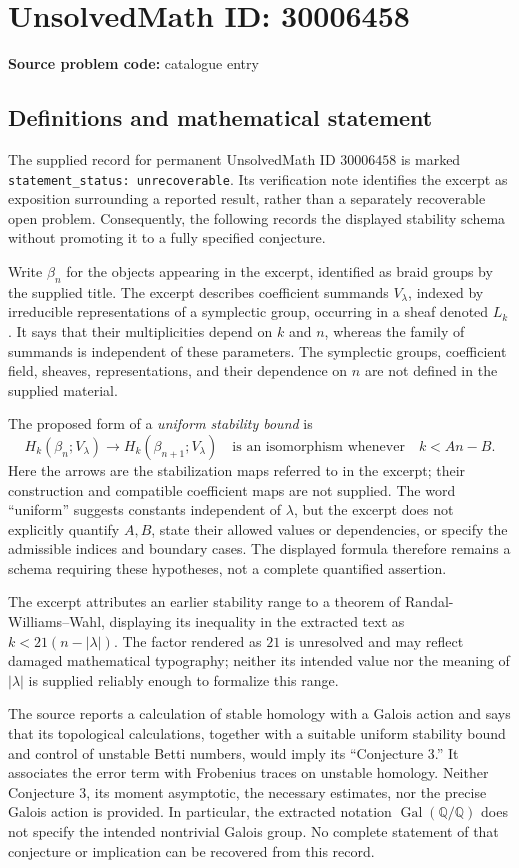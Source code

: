 \documentclass[11pt]{article}
\begin{document}
\section*{UnsolvedMath ID: 30006458}
\textbf{Source problem code:} catalogue entry
\subsection{Definitions and mathematical statement}
The supplied record for permanent UnsolvedMath ID \(30006458\) is marked \texttt{statement\_status: unrecoverable}. Its verification note identifies the excerpt as exposition surrounding a reported result, rather than a separately recoverable open problem. Consequently, the following records the displayed stability schema without promoting it to a fully specified conjecture.

Write \(\beta_n\) for the objects appearing in the excerpt, identified as braid groups by the supplied title. The excerpt describes coefficient summands \(V_\lambda\), indexed by irreducible representations of a symplectic group, occurring in a sheaf denoted \(L_k\). It says that their multiplicities depend on \(k\) and \(n\), whereas the family of summands is independent of these parameters. The symplectic groups, coefficient field, sheaves, representations, and their dependence on \(n\) are not defined in the supplied material.

The proposed form of a \emph{uniform stability bound} is
\[
H_k(\beta_n;V_\lambda)\longrightarrow H_k(\beta_{n+1};V_\lambda)
\quad\text{is an isomorphism whenever}\quad k<An-B.
\]
Here the arrows are the stabilization maps referred to in the excerpt; their construction and compatible coefficient maps are not supplied. The word ``uniform'' suggests constants independent of \(\lambda\), but the excerpt does not explicitly quantify \(A,B\), state their allowed values or dependencies, or specify the admissible indices and boundary cases. The displayed formula therefore remains a schema requiring these hypotheses, not a complete quantified assertion.

The excerpt attributes an earlier stability range to a theorem of Randal-Williams--Wahl, displaying its inequality in the extracted text as \(k<21(n-|\lambda|)\). The factor rendered as \(21\) is unresolved and may reflect damaged mathematical typography; neither its intended value nor the meaning of \(|\lambda|\) is supplied reliably enough to formalize this range.

The source reports a calculation of stable homology with a Galois action and says that its topological calculations, together with a suitable uniform stability bound and control of unstable Betti numbers, would imply its ``Conjecture 3.'' It associates the error term with Frobenius traces on unstable homology. Neither Conjecture 3, its moment asymptotic, the necessary estimates, nor the precise Galois action is provided. In particular, the extracted notation \(\operatorname{Gal}(\mathbb Q/\mathbb Q)\) does not specify the intended nontrivial Galois group. No complete statement of that conjecture or implication can be recovered from this record.
\end{document}
